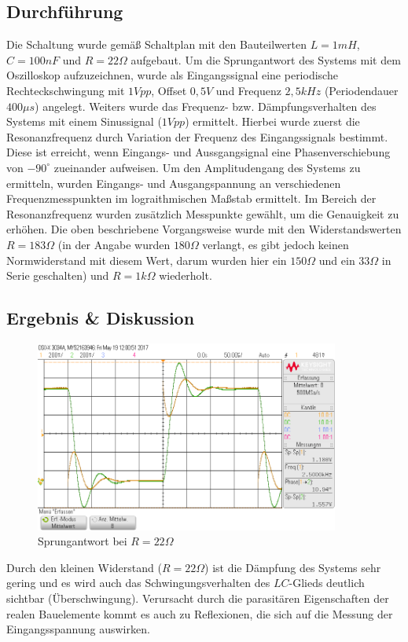 \documentclass[12pt,a4paper,titlepage]{article}
\begin{document}
\subsection{Durchf\"uhrung}
Die Schaltung wurde gem\"aß Schaltplan mit den Bauteilwerten $L=1mH$, $C=100nF$ und $R=22\Omega$ aufgebaut. Um die Sprungantwort des Systems mit dem Oszilloskop aufzuzeichnen, wurde als Eingangssignal eine periodische Rechteckschwingung mit $1Vpp$, Offset $0,5V$ und Frequenz $2,5kHz$ (Periodendauer $400\mu s$) angelegt. Weiters wurde das Frequenz- bzw. D\"ampfungsverhalten des Systems mit einem Sinussignal ($1Vpp$) ermittelt. Hierbei wurde zuerst die Resonanzfrequenz durch Variation der Frequenz des Eingangssignals bestimmt. Diese ist erreicht, wenn Eingangs- und Aussgangsignal eine Phasenverschiebung von $-90^{\circ}$ zueinander aufweisen. Um den Amplitudengang des Systems zu ermitteln, wurden Eingangs- und Ausgangspannung an verschiedenen Frequenzmesspunkten im lograithmischen Maßstab ermittelt. Im Bereich der Resonanzfrequenz wurden zusätzlich Messpunkte gewählt, um die Genauigkeit zu erhöhen. Die oben beschriebene Vorgangsweise wurde mit den Widerstandswerten $R = 183 \Omega$ (in der Angabe wurden $180\Omega$ verlangt, es gibt jedoch keinen Normwiderstand mit diesem Wert, darum wurden hier ein $150\Omega$ und ein $33\Omega$ in Serie geschalten) und $R = 1k\Omega$ wiederholt.

\subsection{Ergebnis \& Diskussion}
\begin{figure}[H]
  \centering
  \includegraphics[width=100mm]{sprungantwort_rlc_22.png}
  \caption{Sprungantwort bei $R=22\Omega$}
\end{figure}
Durch den kleinen Widerstand ($R=22\Omega$) ist die Dämpfung des Systems sehr gering und es wird auch das Schwingungsverhalten des $LC$-Glieds deutlich sichtbar (\"Uberschwingung). Verursacht durch die parasit\"aren Eigenschaften der realen Bauelemente kommt es auch zu Reflexionen, die sich auf die Messung der Eingangsspannung auswirken.
\end{document}
